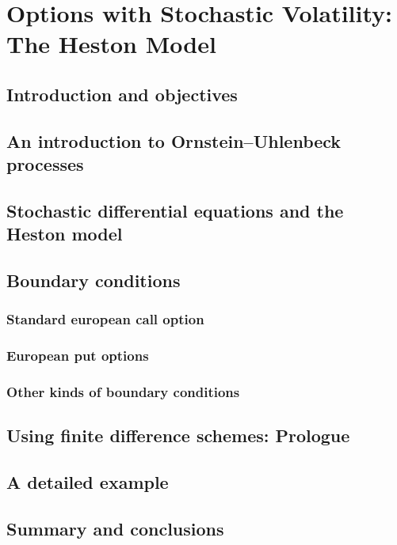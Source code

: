 \chapter{Options with Stochastic Volatility: The Heston Model}

\section{Introduction and objectives}

\section{An introduction to Ornstein–Uhlenbeck processes}

\section{Stochastic differential equations and the Heston model}

\section{Boundary conditions}

\subsection{Standard european call option}

\subsection{European put options}

\subsection{Other kinds of boundary conditions}

\section{Using finite difference schemes: Prologue}

\section{A detailed example}

\section{Summary and conclusions}
